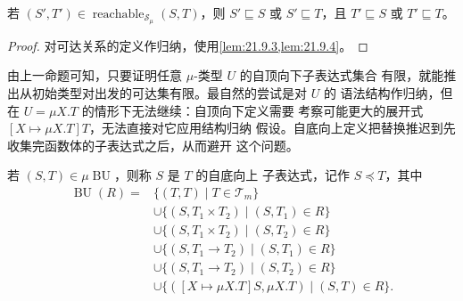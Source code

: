 
\begin{proposition}
\label{prop:21.9.5}
若 \((S',T')\in\operatorname{reachable}_{\mathcal S_\mu}(S,T)\)，则
\(S'\sqsubseteq S\) 或 \(S'\sqsubseteq T\)，且
\(T'\sqsubseteq S\) 或 \(T'\sqsubseteq T\)。
\end{proposition}

\begin{proof}
对可达关系的定义作归纳，使用\cref{lem:21.9.3,lem:21.9.4}。
\end{proof}

由上一命题可知，只要证明任意 \(\mu\)-类型 \(U\) 的自顶向下子表达式集合
有限，就能推出从初始类型对出发的可达集有限。最自然的尝试是对 \(U\) 的
语法结构作归纳，但在 \(U=\mu X.T\) 的情形下无法继续：自顶向下定义需要
考察可能更大的展开式 \([X\mapsto\mu X.T]T\)，无法直接对它应用结构归纳
假设。自底向上定义把替换推迟到先收集完函数体的子表达式之后，从而避开
这个问题。

\begin{definition}
\label{def:21.9.6}
若 \((S,T)\in\mu\operatorname{BU}\)，则称 \(S\) 是 \(T\) 的自底向上
子表达式，记作 \(S\preccurlyeq T\)，其中
\[
\begin{aligned}
\operatorname{BU}(R)={}&\{(T,T)\mid T\in\mathcal T_m\}\\
&\cup\{(S,T_1\times T_2)\mid(S,T_1)\in R\}\\
&\cup\{(S,T_1\times T_2)\mid(S,T_2)\in R\}\\
&\cup\{(S,T_1\to T_2)\mid(S,T_1)\in R\}\\
&\cup\{(S,T_1\to T_2)\mid(S,T_2)\in R\}\\
&\cup\{([X\mapsto\mu X.T]S,\mu X.T)\mid(S,T)\in R\}.
\end{aligned}
\]
\end{definition}

